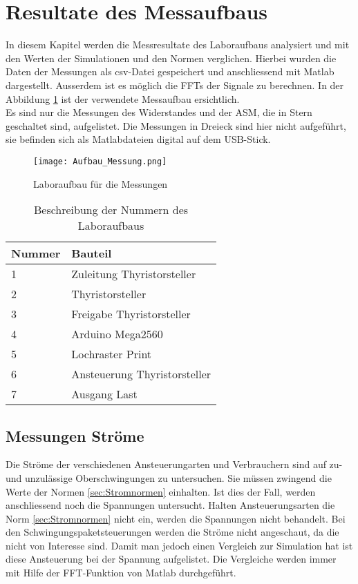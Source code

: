 \section{Resultate des Messaufbaus}
In diesem Kapitel werden die Messresultate des Laboraufbaus analysiert und mit den Werten der Simulationen und den Normen verglichen. Hierbei wurden die Daten der Messungen als csv-Datei gespeichert und anschliessend mit Matlab dargestellt. Ausserdem ist es möglich die FFTs der Signale zu berechnen. In der Abbildung \ref{fig:Aufbau Messung} ist der verwendete Messaufbau ersichtlich.\\
Es sind nur die Messungen des Widerstandes und der ASM, die in Stern geschaltet sind, aufgelistet. Die Messungen in Dreieck sind hier nicht aufgeführt, sie befinden sich als Matlabdateien digital auf dem USB-Stick. 

\begin{figure}[ht!]
	\centering
	\texttt{[image: Aufbau\_Messung.png]}	
	\caption{Laboraufbau für die Messungen}\label{fig:Aufbau Messung}
\end{figure}


\begin{table}[ht!]
	\centering
	\begin{tabular}{|l|l|}
		\hline
		Nummer & Bauteil                                       \\ \hline
		1      & Zuleitung Thyristorsteller                \\ \hline
		2      & Thyristorsteller                              \\ \hline
		3      & Freigabe Thyristorsteller                     \\ \hline
		4      & Arduino Mega2560                              \\ \hline
		5      & Lochraster Print							   \\ \hline
		6      & Ansteuerung Thyristorsteller                  \\ \hline
		7      & Ausgang Last                      \\ \hline
	\end{tabular}
	\caption{Beschreibung der Nummern des Laboraufbaus}\label{tab:Nummern_Laboraufbau}
\end{table}





\newpage
\subsection{Messungen Ströme}
Die Ströme der verschiedenen Ansteuerungarten und Verbrauchern sind auf zu- und unzulässige Oberschwingungen zu untersuchen. Sie müssen zwingend die Werte der Normen \ref{sec:Stromnormen} einhalten. Ist dies der Fall, werden anschliessend noch die Spannungen untersucht. Halten Ansteuerungsarten die Norm \ref{sec:Stromnormen} nicht ein, werden die Spannungen nicht behandelt. Bei den Schwingungspaketsteuerungen werden die Ströme nicht angeschaut, da die nicht von Interesse sind. Damit man jedoch einen Vergleich zur Simulation hat ist diese Ansteuerung bei der Spannung aufgelistet. Die Vergleiche werden immer mit Hilfe der FFT-Funktion von Matlab durchgeführt. 

